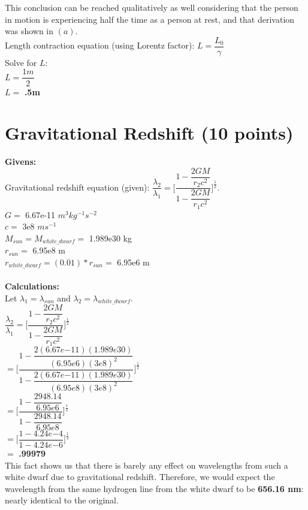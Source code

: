 \documentclass{article}
\begin{document}
\begin{adjustwidth}{.6cm}{}
\begin{enumerate}[a)]
            This conclusion can be reached qualitatively as well considering that the person in motion is experiencing half the time as a person at rest, and that derivation was shown in $(a)$.\\

            Length contraction equation (using Lorentz factor): $L = \dfrac{L_0}{\gamma}$\\
            Solve for $L$:\\

            $L = \dfrac{1m}{2}$\\

            $L = $ \textbf{.5m}


        \end{enumerate}
    \end{adjustwidth}

\section {Gravitational Redshift (10 points)}
    \begin{adjustwidth}{.85cm}{}
        \textbf{Givens:}\\
        Gravitational redshift equation (given): $\dfrac{\lambda_2}{\lambda_1} = \Bigg[\dfrac{1-\dfrac{2GM}{{r_2}c^2}}{1-\dfrac{2GM}{{r_1}c^2}}\Bigg]^\frac{1}{2}$. \\
        $G = $ 6.67e-11 $m^3kg^{-1}s^{-2}$\\
        $c = $ 3e8 $ms^{-1}$\\
        $M_{sun} = M_{white\_dwarf} = $ 1.989e30 kg\\
        $r_{sun} = $ 6.95e8 m\\
        $r_{white\_dwarf} = (0.01)*r_{sun} = $ 6.95e6 m\\
        \\
        \textbf{Calculations:}\\
        Let $\lambda_1 = \lambda_{sun}$ and $\lambda_2 = \lambda_{white\_dwarf}$.\\
        $\dfrac{\lambda_2}{\lambda_1} = \Bigg[\dfrac{1-\dfrac{2GM}{{r_2}c^2}}{1-\dfrac{2GM}{{r_1}c^2}}\Bigg]^\frac{1}{2}$\\

        $ = \Bigg[\dfrac{1-\dfrac{2(6.67e{-11})(1.989e30)}{(6.95e6)(3e8)^2}}{1-\dfrac{2(6.67e{-11})(1.989e30)}{(6.95e8)(3e8)^2}}\Bigg]^\frac{1}{2}$\\

        $ = \Bigg[\dfrac{1-\dfrac{2948.14}{6.95e6}}{1-\dfrac{2948.14}{6.95e8}}\Bigg]^\frac{1}{2}$\\

        $ = \Bigg[\dfrac{1-4.24e{-4}}{1-4.24e{-6}}\Bigg]^\frac{1}{2}$\\

        $ = $ \textbf{.99979}\\

        \noindent
        This fact shows us that there is barely any effect on wavelengths from such a white dwarf due to gravitational redshift. Therefore, we would expect the wavelength from the same hydrogen line from the white dwarf to be \textbf{656.16 nm}: nearly identical to the original.
    \end{adjustwidth}
\end{document}

